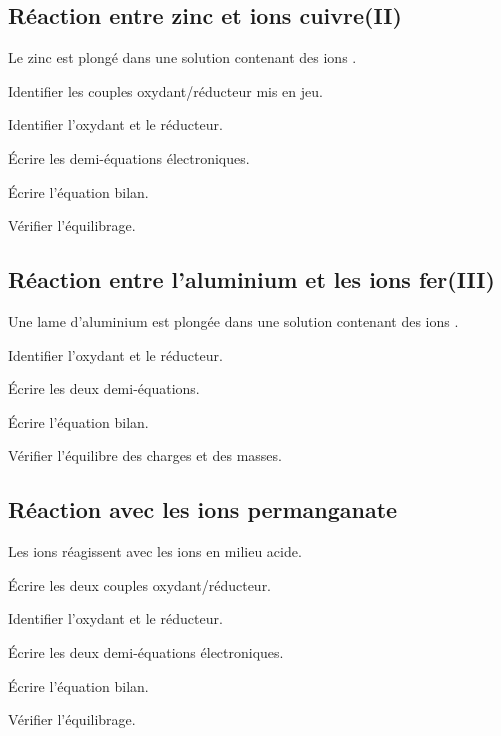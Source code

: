 \documentclass[12pt]{article}
\begin{document}
\subsection{Réaction entre zinc et ions cuivre(II)}

Le zinc  est plongé dans une solution contenant des ions .

\begin{compactitem}
    \item Identifier les couples oxydant/réducteur mis en jeu.
    \item Identifier l’oxydant et le réducteur.
    \item Écrire les demi-équations électroniques.
    \item Écrire l’équation bilan.
    \item Vérifier l’équilibrage.
\end{compactitem}

\subsection{Réaction entre l’aluminium et les ions fer(III)}

\begin{compactitem}
    \item Une lame d’aluminium est plongée dans une solution contenant des ions .
    \item Identifier l’oxydant et le réducteur.
    \item Écrire les deux demi-équations.
    \item Écrire l’équation bilan.
    \item Vérifier l’équilibre des charges et des masses.
\end{compactitem}

\subsection{Réaction avec les ions permanganate }

\begin{compactitem}
    \item Les ions  réagissent avec les ions  en milieu acide.
    \item Écrire les deux couples oxydant/réducteur.
    \item Identifier l’oxydant et le réducteur.
    \item Écrire les deux demi-équations électroniques.
    \item Écrire l’équation bilan.
    \item Vérifier l’équilibrage.
\end{compactitem}
\end{document}
